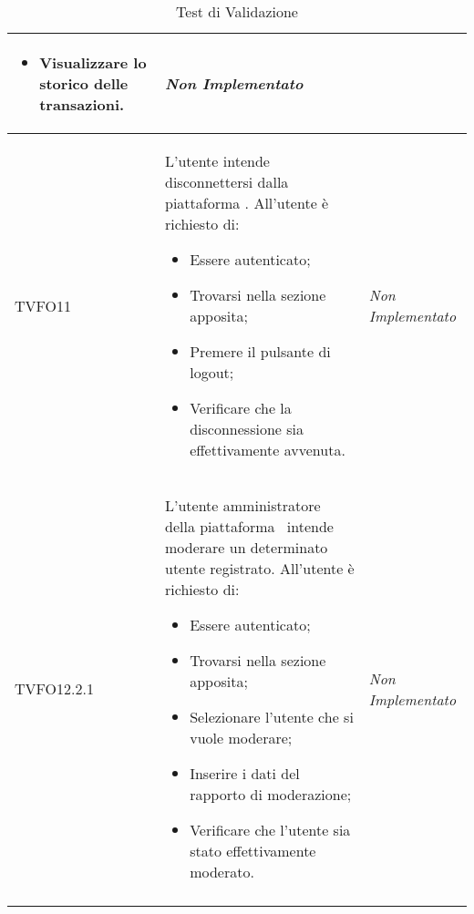 \begin{longtable}{|>{\centering\arraybackslash}p{2.3cm}|>{\centering\arraybackslash}p{7.5cm} | >{\centering\arraybackslash}p{4cm}|}
\begin{itemize}
			\item Visualizzare lo storico delle transazioni.
		\end{itemize} & \textit{Non Implementato}\\ \hline		
		\hypertarget{TVFO11}{TVFO11} & L’utente intende disconnettersi dalla piattaforma \progetto. All’utente è richiesto di:
		\begin{itemize}
			\item Essere autenticato;
			\item Trovarsi nella sezione apposita;
			\item Premere il pulsante di logout;
			\item Verificare che la disconnessione sia effettivamente avvenuta.
		\end{itemize}
		& \textit{Non Implementato}\\ \hline
		\hypertarget{TVFO12.2.1}{TVFO12.2.1} & L’utente amministratore della piattaforma \progetto\ intende moderare un determinato utente registrato. All’utente è richiesto di:
		\begin{itemize}
			\item Essere autenticato;
			\item Trovarsi nella sezione apposita;
			\item Selezionare l'utente che si vuole moderare;
			\item Inserire i dati del rapporto di moderazione;
			\item Verificare che l'utente sia stato effettivamente moderato.
		\end{itemize} & \textit{Non Implementato}\\ \hline
		\caption[Test di Validazione]{Test di Validazione}
		\label{tabella:test0}
	\end{longtable}
	\clearpage
	
